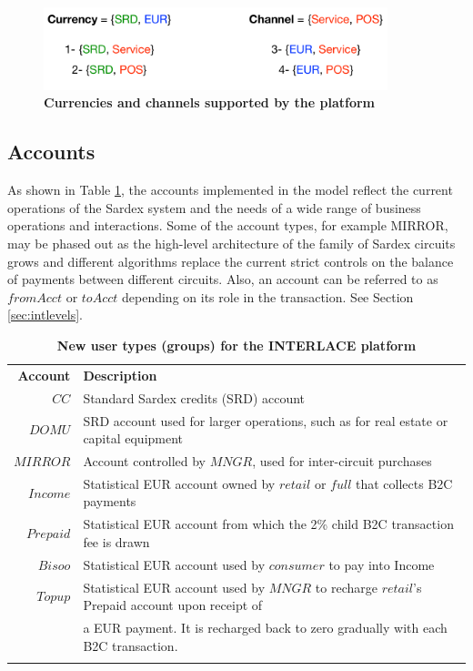 \begin{figure}[h]
\vspace{-0.3cm}
\centering
\includegraphics[width=10cm]{Figures/Curr_Chan}
\caption{\small\textbf{Currencies and channels supported by the platform}}
\label{fig:currchan}
\vspace{-0.5cm}
\end{figure}

\subsection{Accounts}
As shown in Table \ref{tab:accounts}, the accounts implemented in the model reflect the current operations of the Sardex system and the needs of a wide range of business operations and interactions. Some of the account types, for example MIRROR, may be phased out as the high-level architecture of the family of Sardex circuits grows and different algorithms replace the current strict controls on the balance of payments between different circuits. Also, an account can be referred to as $fromAcct$ or $toAcct$ depending on its role in the transaction. See Section \ref{sec:intlevels}.

\setlength{\tabcolsep}{10pt}
\begin{table}[htbp]
\vspace{-0.3cm}
\begin{centering}
\small
{
\begin{tabular}{ r | l  }
\hline
\textbf{Account}	& \textbf{Description} \\
\Xhline{1.5pt}
$CC$ & Standard Sardex credits (SRD) account \\
\hline
$DOMU$ & SRD account used for larger operations, such as for real estate or capital equipment\\
\hline
$MIRROR$ & Account controlled by $MNGR$, used for inter-circuit purchases \\
\hline
$Income$ & Statistical EUR account owned by $retail$ or $full$ that collects B2C payments\\
\hline
$Prepaid$ & Statistical EUR account from which the 2\% child B2C transaction fee is drawn \\
\hline
$Bisoo$ & Statistical EUR account used by $consumer$ to pay into Income \\
\hline
$Topup$ & Statistical EUR account used by $MNGR$ to recharge $retail$'s Prepaid account upon receipt of \\
&\hspace{0.5cm} a EUR payment. It is recharged back to zero gradually with each B2C transaction. \\
\Xhline{1.5pt}
\end{tabular}
}
\caption{\small\textbf{New user types (groups) for the INTERLACE platform}}
\label{tab:accounts}
\end{centering}
\vspace{-0.3cm}
\end{table}

